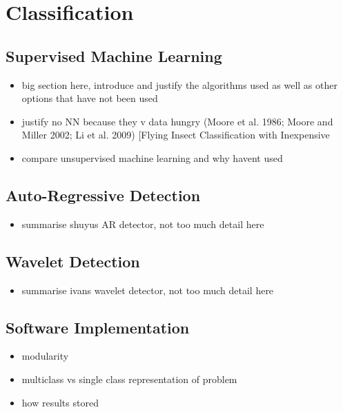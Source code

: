 \section{Classification}
\label{sec:pl-clf}

    \subsection{Supervised Machine Learning}
    \label{subsec:pl-clf-sup}
        \begin{itemize}
            \item{big section here, introduce and justify the algorithms used as well as other options that have not been used}
            \item{justify no NN because they v data hungry  (Moore et al. 1986; Moore and Miller 2002; Li et al. 2009) [Flying Insect Classification with Inexpensive}
            \item{compare unsupervised machine learning and why havent used}
        \end{itemize}
    
    \subsection{Auto-Regressive Detection}
    \label{subsec:pl-clf-ar}
        \begin{itemize}
            \item{summarise shuyus AR detector, not too much detail here}
        \end{itemize}
    
    \subsection{Wavelet Detection}
    \label{subsec:pl-clf-wavelet}
        \begin{itemize}
            \item{summarise ivans wavelet detector, not too much detail here}
        \end{itemize}

    \subsection{Software Implementation}
    \label{subsec:pl-clf-software}
        \begin{itemize}
            \item{modularity}
            \item{multiclass vs single class representation of problem}
            \item{how results stored}
        \end{itemize}